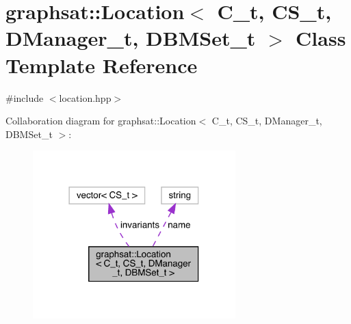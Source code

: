 \hypertarget{classgraphsat_1_1_location}{}\section{graphsat\+::Location$<$ C\+\_\+t, C\+S\+\_\+t, D\+Manager\+\_\+t, D\+B\+M\+Set\+\_\+t $>$ Class Template Reference}
\label{classgraphsat_1_1_location}


{\ttfamily \#include $<$location.\+hpp$>$}



Collaboration diagram for graphsat\+::Location$<$ C\+\_\+t, C\+S\+\_\+t, D\+Manager\+\_\+t, D\+B\+M\+Set\+\_\+t $>$\+:
\nopagebreak
\begin{figure}[H]
\begin{center}
\leavevmode
\includegraphics[width=222pt]{classgraphsat_1_1_location__coll__graph}
\end{center}
\end{figure}
